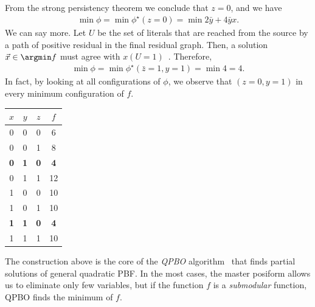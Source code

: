 %
From the strong persistency theorem we conclude that $z=0$, and we have
\begin{align*}
	\min \phi = \min \phi^{\star}(z=0) = \min 2\bar{y} + 4\bar{y}x.
\end{align*}
%
We can say more. Let $U$ be the set of literals that are reached from the source by a path of positive residual in the final residual graph. Then, a solution $\vec x \in \argmin f$ must agree with $x(U=1)$~\cite{boros02pseudo}. Therefore,
\begin{align*}
	\min \phi = \min \phi^{\star}(\bar{z}=1,y=1) = \min 4 = 4.
\end{align*}
%
In fact, by looking at all configurations of $\phi$, we observe that $(z=0,y=1)$ in every minimum configuration of $f$.

\begin{center}
\begin{tabular}{|c|c|c|c|}
\hline
$x$ & $y$ & $z$ & $f$\\
\hline
0 & 0 & 0 & 6 \\
0 & 0 & 1 & 8 \\
\textbf{0} & \textbf{1} & \textbf{0} & \textbf{4} \\
0 & 1 & 1 & 12 \\
1 & 0 & 0 & 10 \\
1 & 0 & 1 & 10 \\
\textbf{1} & \textbf{1} & \textbf{0} & \textbf{4} \\
1 & 1 & 1 & 10 \\
\hline
\end{tabular}
\end{center}

The construction above is the core of the \emph{QPBO} algorithm~\cite{boros91} that finds partial solutions of general quadratic PBF.  In the most cases, the master posiform allows us to eliminate only few variables, but if the function $f$ is a \emph{submodular} function, QPBO finds the minimum of $f$.



